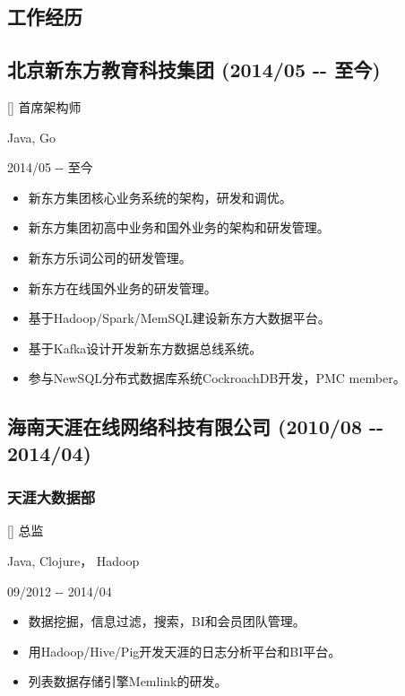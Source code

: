 \documentclass[a4paper]{article}
\newenvironment{DUlineblock}[1]{%
    \list{}{\setlength{\partopsep}{\parskip}
            \addtolength{\partopsep}{\baselineskip}
            \setlength{\topsep}{0pt}
            \setlength{\itemsep}{0.15\baselineskip}
            \setlength{\parsep}{0pt}
            \setlength{\leftmargin}{#1}}
    \raggedright
  }
  {\endlist}
\begin{document}
\begin{CJK}{UTF8}{gkai}
\section*{工作经历}
\subsection*{北京新东方教育科技集团 (2014/05 -{}- 至今)}
\begin{DUlineblock}{0em}
\item[] 首席架构师
\item[] Java, Go
\item[] 2014/05 -{}- 至今
\end{DUlineblock}
\begin{itemize}
\item 新东方集团核心业务系统的架构，研发和调优。
\item 新东方集团初高中业务和国外业务的架构和研发管理。
\item 新东方乐词公司的研发管理。
\item 新东方在线国外业务的研发管理。
\item 基于Hadoop/Spark/MemSQL建设新东方大数据平台。
\item 基于Kafka设计开发新东方数据总线系统。
\item 参与NewSQL分布式数据库系统CockroachDB开发，PMC member。
\end{itemize}

\subsection*{海南天涯在线网络科技有限公司 (2010/08 -{}- 2014/04)}

\subsubsection*{天涯大数据部}
\begin{DUlineblock}{0em}
\item[] 总监
\item[] Java, Clojure， Hadoop
\item[] 09/2012 -{}- 2014/04
\end{DUlineblock}
\begin{itemize}
\item 数据挖掘，信息过滤，搜索，BI和会员团队管理。
\item 用Hadoop/Hive/Pig开发天涯的日志分析平台和BI平台。
\item 列表数据存储引擎Memlink的研发。
\end{itemize}



\end{CJK}
\end{document}
